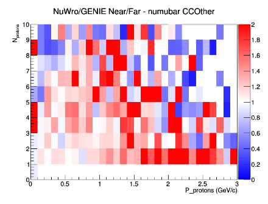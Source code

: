 \begin{figure}[h]
\endminipage
{}
\includegraphics[width=\linewidth]{N_P/nominal/protons/ratios/CCOther_NuWro_GENIE_numubar_NF_N_P.png}
\endminipage
\newline
\end{figure}
\clearpage

